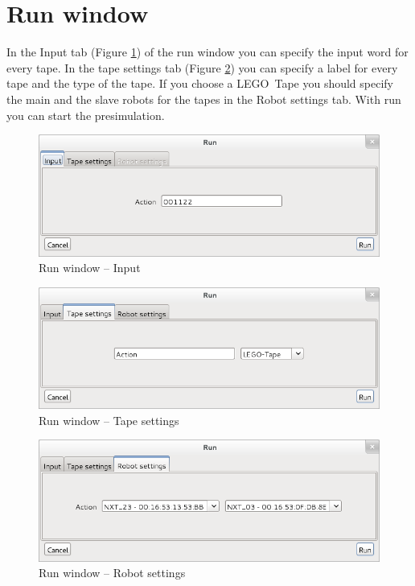 \documentclass[%
  a4paper,%
  11pt,%
  blue,%
  hyperref	%
  ]{tubsartcl}
\begin{document}
\clearpage

\section{Run window}
In the Input tab (Figure \ref{pic:run_window_input}) of the run window you can specify the input word for every tape. In the tape settings tab (Figure \ref{pic:run_window_tape_settings}) you can specify a label for every tape and the type of the tape. If you choose a LEGO\textregistered\, Tape you should specify the main and the slave robots for the tapes in the Robot settings tab. With run you can start the presimulation.
\begin{figure}[!htb]
\begin{center}
\includegraphics[scale=0.5]{graphics_gui/run_window_input.png}
\end{center}
\caption{Run window -- Input}
\label{pic:run_window_input}
\end{figure}


\begin{figure}[!htb]
\begin{center}
\includegraphics[scale=0.5]{graphics_gui/run_window_tape_settings.png}
\end{center}
\caption{Run window -- Tape settings}
\label{pic:run_window_tape_settings}
\end{figure}


\begin{figure}[!htb]
\begin{center}
\includegraphics[scale=0.5]{graphics_gui/run_window_robot_settings.png}
\end{center}
\caption{Run window -- Robot settings}
\label{pic:run_window_robot_settings}
\end{figure}
 
\end{document}
